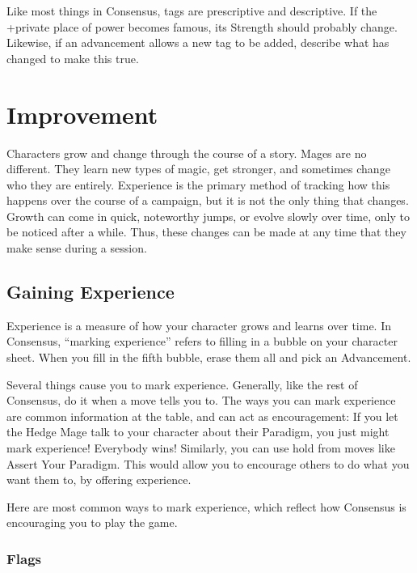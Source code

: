 \documentclass[
]{article}
\begin{document}
Like most things in Consensus, tags are prescriptive and descriptive. If
the +private place of power becomes famous, its Strength should probably
change. Likewise, if an advancement allows a new tag to be added,
describe what has changed to make this true.

\newpage

\hypertarget{improvement-1}{%
\section{Improvement}\label{improvement-1}}

Characters grow and change through the course of a story. Mages are no
different. They learn new types of magic, get stronger, and sometimes
change who they are entirely. Experience is the primary method of
tracking how this happens over the course of a campaign, but it is not
the only thing that changes. Growth can come in quick, noteworthy jumps,
or evolve slowly over time, only to be noticed after a while. Thus,
these changes can be made at any time that they make sense during a
session.

\hypertarget{gaining-experience}{%
\subsection{Gaining Experience}\label{gaining-experience}}

Experience is a measure of how your character grows and learns over
time. In Consensus, ``marking experience'' refers to filling in a bubble
on your character sheet. When you fill in the fifth bubble, erase them
all and pick an Advancement.

Several things cause you to mark experience. Generally, like the rest of
Consensus, do it when a move tells you to. The ways you can mark
experience are common information at the table, and can act as
encouragement: If you let the Hedge Mage talk to your character about
their Paradigm, you just might mark experience! Everybody wins!
Similarly, you can use hold from moves like Assert Your Paradigm. This
would allow you to encourage others to do what you want them to, by
offering experience.

Here are most common ways to mark experience, which reflect how
Consensus is encouraging you to play the game.

\hypertarget{flags-1}{%
\subsubsection{Flags}\label{flags-1}}
\end{document}
